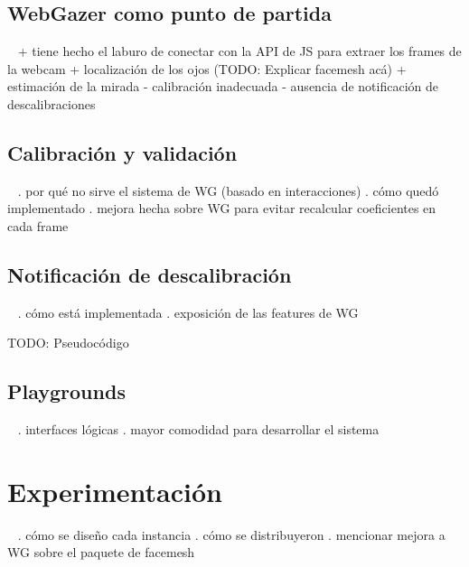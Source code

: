 \documentclass[aspectratio=169]{beamer}
\begin{document}
\subsection{WebGazer como punto de partida}

\begin{frame}{~}
+ tiene hecho el laburo de conectar con la API de JS para extraer los frames de
  la webcam
  + localización de los ojos (TODO: Explicar facemesh acá)
+ estimación de la mirada
- calibración inadecuada
- ausencia de notificación de descalibraciones
\end{frame}

\subsection{Calibración y validación}

\begin{frame}{~}
. por qué no sirve el sistema de WG (basado en interacciones)
. cómo quedó implementado
. mejora hecha sobre WG para evitar recalcular coeficientes en cada frame
\end{frame}

\subsection{Notificación de descalibración}

\begin{frame}{~}
. cómo está implementada
. exposición de las features de WG

TODO: Pseudocódigo
\end{frame}

\subsection{Playgrounds}

\begin{frame}{~}
. interfaces lógicas
. mayor comodidad para desarrollar el sistema
\end{frame}

\section{Experimentación}

\begin{frame}{~}
. cómo se diseño cada instancia
. cómo se distribuyeron
. mencionar mejora a WG sobre el paquete de facemesh
\end{frame}
\end{document}
